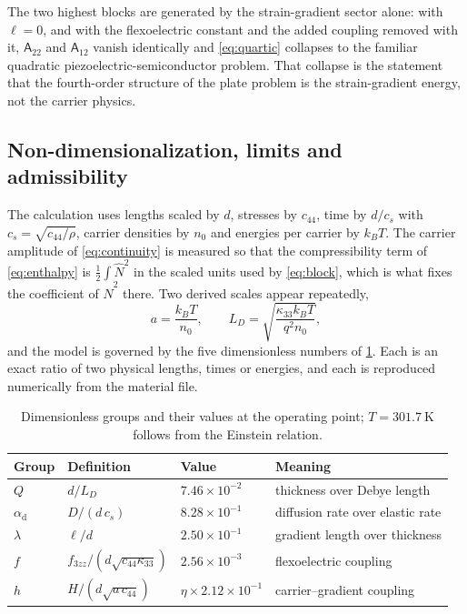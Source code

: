 The two highest blocks are
generated by the strain-gradient sector alone: with $\ell=0$, and with the
flexoelectric constant and the added coupling removed with it, $\mathsf A_{22}$
and $\mathsf A_{12}$ vanish identically and \eqref{eq:quartic} collapses to the
familiar quadratic piezoelectric-semiconductor problem.  That collapse is the
statement that the fourth-order structure of the plate problem is the
strain-gradient energy, not the carrier physics.

\subsection{Non-dimensionalization, limits and admissibility}
\label{sec:governing_nondim}
\label{sec:governing_limits}
\label{sec:governing_stability}

The calculation uses lengths scaled by $d$, stresses by $c_{44}$, time by
$d/c_s$ with $c_s=\sqrt{c_{44}/\rho}$, carrier densities by $n_0$ and energies
per carrier by $k_BT$.  The carrier amplitude of \eqref{eq:continuity} is
measured so that the compressibility term of \eqref{eq:enthalpy} is
$\tfrac12\int\widehat N^{2}$ in the scaled units used by \eqref{eq:block}, which
is what fixes the coefficient of $\widehat N^{2}$ there.  Two derived scales appear repeatedly,
\begin{equation}
\label{eq:a_scale}
a=\frac{k_BT}{n_0},\qquad L_D=\sqrt{\frac{\kappa_{33}k_BT}{q^2n_0}},
\end{equation}
and the model is governed by the five dimensionless numbers of
\cref{tab:groups}.  Each is an exact ratio of two physical lengths, times or
energies, and each is reproduced numerically from the material file.

\begin{table}[t]
\centering
\caption{Dimensionless groups and their values at the operating point; $T=\SI{301.7}{\kelvin}$ follows from the Einstein relation.}
\label{tab:groups}
\begin{tabular}{@{}llll@{}}
\toprule
Group & Definition & Value & Meaning \\
\midrule
$Q$ & $d/L_D$ & $7.46\times10^{-2}$ & thickness over Debye length \\
$\alpha_{\mathrm{d}}$ & $D/(d\,c_s)$ & $8.28\times10^{-1}$ & diffusion rate over elastic rate \\
$\lambda$ & $\ell/d$ & $2.50\times10^{-1}$ & gradient length over thickness \\
$f$ & $f_{3zz}/(d\sqrt{c_{44}\kappa_{33}})$ & $2.56\times10^{-3}$ & flexoelectric coupling \\
$h$ & $H/(d\sqrt{a\,c_{44}})$ & $\eta\times2.12\times10^{-1}$ & carrier--gradient coupling \\
\bottomrule
\end{tabular}
\end{table}

